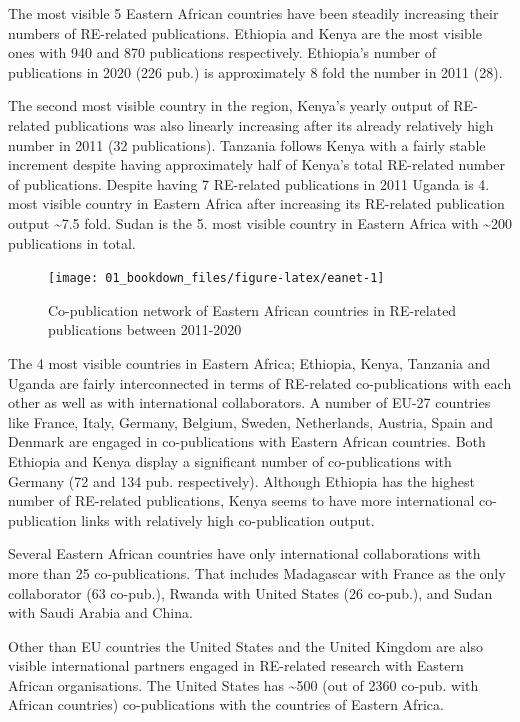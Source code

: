 \documentclass[
]{book}
\begin{document}
The most visible 5 Eastern African countries have been steadily increasing their numbers of RE-related publications. Ethiopia and Kenya are the most visible ones with 940 and 870 publications respectively. Ethiopia's number of publications in 2020 (226 pub.) is approximately 8 fold the number in 2011 (28).

The second most visible country in the region, Kenya's yearly output of RE-related publications was also linearly increasing after its already relatively high number in 2011 (32 publications). Tanzania follows Kenya with a fairly stable increment despite having approximately half of Kenya's total RE-related number of publications. Despite having 7 RE-related publications in 2011 Uganda is 4. most visible country in Eastern Africa after increasing its RE-related publication output \textasciitilde7.5 fold. Sudan is the 5. most visible country in Eastern Africa with \textasciitilde200 publications in total.

\begin{figure}
\texttt{[image: 01\_bookdown\_files/figure-latex/eanet-1]} \caption{Co-publication network of Eastern African countries in RE-related publications between 2011-2020}\label{fig:eanet}
\end{figure}

The 4 most visible countries in Eastern Africa; Ethiopia, Kenya, Tanzania and Uganda are fairly interconnected in terms of RE-related co-publications with each other as well as with international collaborators. A number of EU-27 countries like France, Italy, Germany, Belgium, Sweden, Netherlands, Austria, Spain and Denmark are engaged in co-publications with Eastern African countries. Both Ethiopia and Kenya display a significant number of co-publications with Germany (72 and 134 pub. respectively). Although Ethiopia has the highest number of RE-related publications, Kenya seems to have more international co-publication links with relatively high co-publication output.

Several Eastern African countries have only international collaborations with more than 25 co-publications. That includes Madagascar with France as the only collaborator (63 co-pub.), Rwanda with United States (26 co-pub.), and Sudan with Saudi Arabia and China.

Other than EU countries the United States and the United Kingdom are also visible international partners engaged in RE-related research with Eastern African organisations. The United States has \textasciitilde500 (out of 2360 co-pub. with African countries) co-publications with the countries of Eastern Africa.
\end{document}
